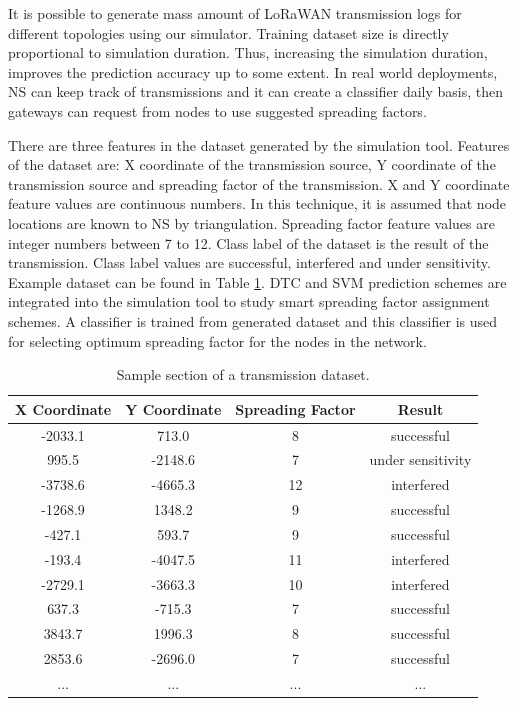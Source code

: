 It is possible to generate mass amount of LoRaWAN transmission logs for different topologies using our simulator. Training dataset size is directly proportional to simulation duration. Thus, increasing the simulation duration, improves the prediction accuracy up to some extent. In real world deployments, NS can keep track of transmissions and it can create a classifier daily basis, then gateways can request from nodes to use suggested spreading factors.

There are three features in the dataset generated by the simulation tool. Features of the dataset are: X coordinate of the transmission source, Y coordinate of the transmission source and spreading factor of the transmission. X and Y coordinate feature values are continuous numbers. In this technique, it is assumed that node locations are known to NS by triangulation. Spreading factor feature values are integer numbers between 7 to 12. Class label of the dataset is the result of the transmission. Class label values are successful, interfered and under sensitivity. Example dataset can be found in Table \ref{table:dataset}. DTC and SVM prediction schemes are integrated into the simulation tool to study smart spreading factor assignment schemes. A classifier is trained from generated dataset and this classifier is used for selecting optimum spreading factor for the nodes in the network.

\begin{table}
\centering
\caption{Sample section of a transmission dataset.}
\label{table:dataset}
\begin{tabular}{|c|c|c|c|}
\hline
\textbf{X Coordinate} & \textbf{Y Coordinate} & \textbf{Spreading Factor} & \textbf{Result} \\ \hline
      -2033.1  &  713.0  &   8   &   successful \\ \hline
       995.5   & -2148.6 &   7   &   under sensitivity \\ \hline
      -3738.6  & -4665.3 &   12  &   interfered \\ \hline
      -1268.9  &  1348.2 &   9   &   successful \\ \hline
      -427.1   &  593.7  &   9   &   successful \\ \hline
      -193.4   & -4047.5 &   11  &   interfered \\ \hline
      -2729.1  & -3663.3 &   10  &   interfered \\ \hline
       637.3   & -715.3 &   7   &   successful \\ \hline
       3843.7  &  1996.3 &   8   &   successful \\ \hline
       2853.6  & -2696.0 &   7   &   successful \\ \hline
      ...      & ...     &   ... &   ... \\ \hline
\end{tabular}
\end{table}


